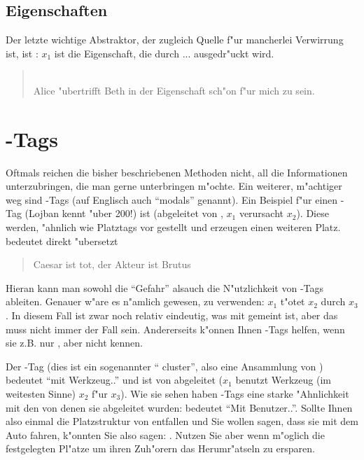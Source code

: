 \subsection{Eigenschaften}
Der letzte wichtige Abstraktor, der zugleich Quelle f"ur mancherlei Verwirrung ist, ist : $x_1$ ist die Eigenschaft, die durch ...
ausgedr"uckt wird.
\begin{quote}
 \\
Alice "ubertrifft Beth in der Eigenschaft sch"on f"ur mich zu sein.
\end{quote}



\section{-Tags}
Oftmals reichen die bisher beschriebenen Methoden nicht, all die Informationen unterzubringen, die man gerne unterbringen m"ochte. Ein weiterer,
m"achtiger weg sind -Tags (auf Englisch auch ``modals'' genannt). Ein Beispiel f"ur einen -Tag (Lojban kennt "uber 200!) ist
 (abgeleitet von , $x_1$ verursacht $x_2$). Diese  werden, "ahnlich wie Platztags vor  gestellt
und erzeugen einen weiteren Platz.  bedeutet direkt "ubersetzt
\begin{quote}
Caesar ist tot, der Akteur ist Brutus
\end{quote}
Hieran kann man sowohl die ``Gefahr'' alsauch die N"utzlichkeit von -Tags ableiten. Genauer w"are es n"amlich gewesen,  zu
verwenden: $x_1$ t"otet $x_2$ durch $x_3$. In diesem Fall ist zwar noch relativ eindeutig, was mit  gemeint ist, aber das muss nicht
immer der Fall sein. Andererseits k"onnen Ihnen -Tags helfen, wenn sie z.B. nur , aber nicht  kennen.

Der -Tag  (dies ist ein sogenannter `` cluster'', also eine Ansammlung von ) bedeutet ``mit Werkzeug..'' und ist von  abgeleitet ($x_1$ benutzt Werkzeug (im weitesten Sinne) $x_2$ f"ur $x_3$). Wie sie sehen haben -Tags
eine starke "Ahnlichkeit mit den  von denen sie abgeleitet wurden:  bedeutet ``Mit Benutzer..''.
Sollte Ihnen also einmal die Platzstruktur von  entfallen und Sie wollen sagen, dass sie mit dem Auto fahren, k"onnten Sie also sagen: .
Nutzen Sie aber wenn m"oglich die festgelegten Pl"atze um ihren Zuh"orern das Herumr"atseln zu ersparen.

